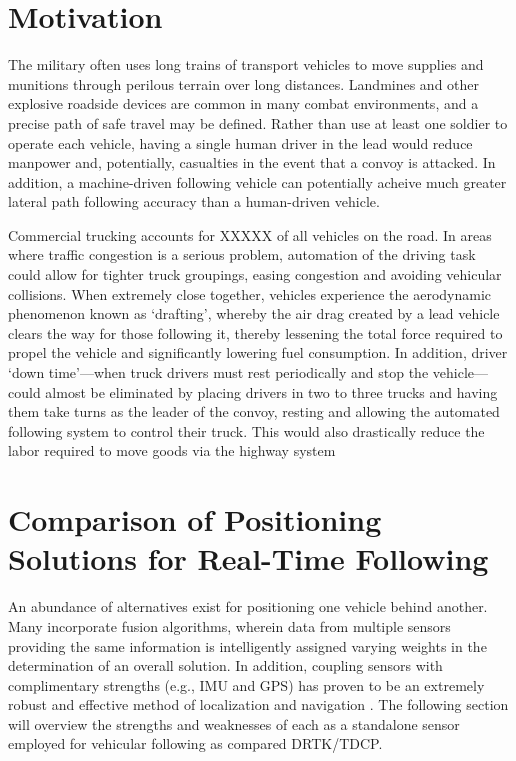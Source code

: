 \documentclass[12pt]{report}
\begin{document}
\section{Motivation} %
The military often uses long trains of transport vehicles to move supplies and munitions through perilous terrain over long distances. Landmines and other explosive roadside devices are common in many combat environments, and a precise path of safe travel may be defined. Rather than use at least one soldier to operate each vehicle, having a single human driver in the lead would reduce manpower and, potentially, casualties in the event that a convoy is attacked. In addition, a machine-driven following vehicle can potentially acheive much greater lateral path following accuracy than a human-driven vehicle.

Commercial trucking accounts for XXXXX of all vehicles on the road. In areas where traffic congestion is a serious problem, automation of the driving task could allow for tighter truck groupings, easing congestion and avoiding vehicular collisions. When extremely close together, vehicles experience the aerodynamic phenomenon known as `drafting', whereby the air drag created by a lead vehicle clears the way for those following it, thereby lessening the total force required to propel the vehicle and significantly lowering fuel consumption. In addition, driver `down time'---when truck drivers must rest periodically and stop the vehicle---could almost be eliminated by placing drivers in two to three trucks and having them take turns as the leader of the convoy, resting and allowing the automated following system to control their truck. This would also drastically reduce the labor required to move goods via the highway system

\section{Comparison of Positioning Solutions for Real-Time Following}
An abundance of alternatives exist for positioning one vehicle behind another. Many incorporate fusion algorithms, wherein data from multiple sensors providing the same information is intelligently assigned varying weights in the determination of an overall solution. In addition, coupling sensors with complimentary strengths (e.g., IMU and GPS) has proven to be an extremely robust and effective method of localization and navigation \cite{scottthesis}. The following section will overview the strengths and weaknesses of each as a standalone sensor employed for vehicular following as compared DRTK/TDCP.
\end{document}
